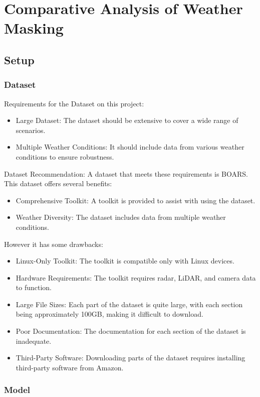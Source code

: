 \chapter{Comparative Analysis of Weather Masking}
\section{Setup}
\subsection{Dataset}
Requirements for the Dataset on this project:
\begin{itemize}
    \item Large Dataset: The dataset should be extensive to cover a wide range of scenarios.
    \item Multiple Weather Conditions: It should include data from various weather conditions to ensure robustness.
\end{itemize}
Dataset Recommendation: A dataset that meets these requirements is BOARS.\\
This dataset offers several benefits:
\begin{itemize}
    \item Comprehensive Toolkit: A toolkit is provided to assist with using the dataset.
    \item Weather Diversity: The dataset includes data from multiple weather conditions.
\end{itemize}
However it has some drawbacks:
\begin{itemize}
    \item Linux-Only Toolkit: The toolkit is compatible only with Linux devices.
    \item Hardware Requirements: The toolkit requires radar, LiDAR, and camera data to function.
    \item Large File Sizes: Each part of the dataset is quite large, with each section being approximately 100GB, making it difficult to download.
    \item Poor Documentation: The documentation for each section of the dataset is inadequate.
    \item Third-Party Software: Downloading parts of the dataset requires installing third-party software from Amazon.
\end{itemize}

\subsection{Model}

